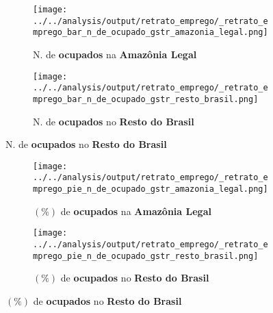 \documentclass[11pt]{beamer}
\begin{document}
\begin{frame}[label=_retrato_emprego_bar_n_de_ocupado_gstr]{}
\textit{\hyperlink{indice_principal}{}}
\begin{figure}
\centering
\begin{subfigure}{.5\textwidth}
  \centering
  \texttt{[image: ../../analysis/output/retrato\_emprego/\_retrato\_emprego\_bar\_n\_de\_ocupado\_gstr\_amazonia\_legal.png]}
  \label{fig:_retrato_emprego_bar_n_de_ocupado_gstr_amazonia_legal}
  \caption{{\tiny N. de \textbf{ocupados} na \textbf{Amazônia Legal}}}
\end{subfigure}%
\begin{subfigure}{.5\textwidth}
  \centering
  \texttt{[image: ../../analysis/output/retrato\_emprego/\_retrato\_emprego\_bar\_n\_de\_ocupado\_gstr\_resto\_brasil.png]}
  \label{fig:_retrato_emprego_bar_n_de_ocupado_gstr_resto_brasil}
   \caption{{\tiny N. de \textbf{ocupados} no \textbf{Resto do Brasil}}}
\end{subfigure}
\end{figure}
\end{frame}

\begin{frame}[label=_retrato_emprego_pie_n_de_ocupado_gstr]{}
\textit{\hyperlink{indice_principal}{}}
\begin{figure}
\centering
\begin{subfigure}{.5\textwidth}
  \centering
  \texttt{[image: ../../analysis/output/retrato\_emprego/\_retrato\_emprego\_pie\_n\_de\_ocupado\_gstr\_amazonia\_legal.png]}
  \label{fig:_retrato_emprego_pie_n_de_ocupado_gstr_amazonia_legal}
  \caption{{\tiny $(\%)$ de \textbf{ocupados} na \textbf{Amazônia Legal}}}
\end{subfigure}%
\begin{subfigure}{.5\textwidth}
  \centering
  \texttt{[image: ../../analysis/output/retrato\_emprego/\_retrato\_emprego\_pie\_n\_de\_ocupado\_gstr\_resto\_brasil.png]}
  \label{fig:_retrato_emprego_pie_n_de_ocupado_gstr_resto_brasil}
   \caption{{\tiny $(\%)$ de \textbf{ocupados} no \textbf{Resto do Brasil}}}
\end{subfigure}
\end{figure}
\end{frame}
\end{document}
